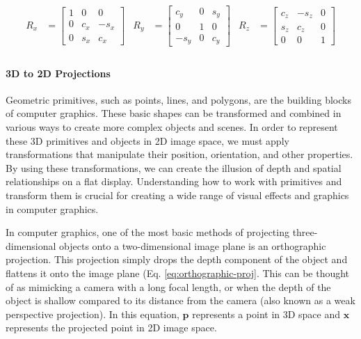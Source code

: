 \begin{equation}
    \begin{aligned}
        R_{x} &= \begin{bmatrix}
            1 & 0 & 0 \\ 0 & c_x & -s_x \\ 0 & s_x & c_x
        \end{bmatrix}
        &R_{y} &= \begin{bmatrix}
            c_y & 0 & s_y \\ 0 & 1 & 0 \\ -s_y & 0 & c_y
        \end{bmatrix}
        &R_{z} &= \begin{bmatrix}
            c_z & -s_z & 0 \\ s_z & c_z & 0 \\ 0 & 0 & 1
        \end{bmatrix} \\
    \end{aligned}
    \label{eq:euler-angles}
\end{equation}


\paragraph*{3D to 2D Projections}
Geometric primitives, such as points, lines, and polygons, are the building blocks of computer graphics. These basic shapes can be transformed and combined in various ways to create more complex objects and scenes. In order to represent these 3D primitives and objects in 2D image space, we must apply transformations that manipulate their position, orientation, and other properties. By using these transformations, we can create the illusion of depth and spatial relationships on a flat display. Understanding how to work with primitives and transform them is crucial for creating a wide range of visual effects and graphics in computer graphics.

In computer graphics, one of the most basic methods of projecting three-dimensional objects onto a two-dimensional image plane is an orthographic projection. This projection simply drops the depth component of the object and flattens it onto the image plane (Eq. \ref{eq:orthographic-proj}. This can be thought of as mimicking a camera with a long focal length, or when the depth of the object is shallow compared to its distance from the camera (also known as a weak perspective projection). In this equation, $\mathbf{p}$ represents a point in 3D space and $\mathbf{x}$ represents the projected point in 2D image space.

